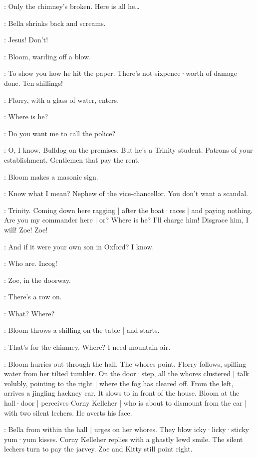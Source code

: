 \Bloom:
Only the chimney's broken.
Here is all he…

:
Bella shrinks back and screams.

\Bella:
Jesus!
Don't!

:
Bloom,
warding off a blow.

\Bloom:
To show you how he hit the paper.
%
There's not sixpence·worth of damage done.
Ten shillings!

:
Florry,
with a glass of water,
enters.

\Florry:
Where is he?

\Bella:
Do you want me to call the police?

\Bloom:
O,
I know.
Bulldog on the premises.
But he's a Trinity student.
Patrons of your establishment.
Gentlemen that pay the rent.

:
Bloom makes a masonic sign.

\Bloom:
Know what I mean?
Nephew of the vice-chancellor.
You don't want a scandal.%

\Bella:
Trinity.
Coming down here ragging |
after the boat·races |
and paying nothing.
Are you my commander here |
or?
Where is he?
I'll charge him!
Disgrace him,
I will!
Zoe!
Zoe!

\Bloom:
And if it were your own son in Oxford?
I know.

\Bella:
Who are.
Incog!

:
Zoe,
in the doorway.

\Zoe:
There's a row on.

\Bloom:
What?
Where?

:
Bloom throws a shilling on the table |
and starts.

\Bloom:
That's for the chimney.
Where?
I need mountain air.

:
Bloom hurries out through the hall.
The whores point.
Florry follows,
spilling water from her tilted tumbler.
On the door·step,
all the whores clustered |
talk volubly,
pointing to the right |
where the fog has cleared off.
From the left,
arrives a jingling hackney car.
It slows to in front of the house.
Bloom at the hall·door |
perceives Corny Kelleher |
who is about to dismount from the car |
with two silent lechers.
%
He averts his face.

:
Bella from within the hall |
urges on her whores.
They blow icky·licky·sticky yum·yum kisses.
Corny Kelleher replies with a ghastly lewd smile.
The silent lechers turn to pay the jarvey.
Zoe and Kitty still point right.

